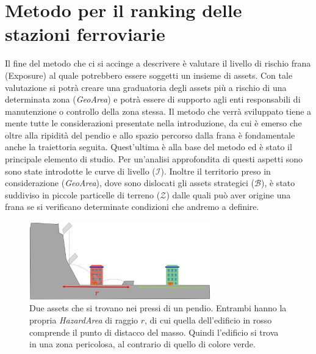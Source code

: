 
\chapter{Metodo per il ranking delle stazioni ferroviarie} %

\label{ch:mathtest} %

Il fine del metodo che ci si accinge a descrivere è valutare il livello di rischio frana (Exposure) al quale potrebbero essere soggetti un insieme di assets. Con tale valutazione si potrà creare una graduatoria degli assets più a rischio di una determinata zona (\textit{GeoArea}) e potrà essere di supporto agli enti responsabili di manutenzione o controllo della zona stessa. Il metodo che verrà sviluppato tiene a mente tutte le considerazioni presentate nella introduzione, da cui è emerso che oltre alla ripidità del pendio e allo spazio percorso dalla frana è fondamentale anche la traiettoria seguita. Quest'ultima è alla base del metodo ed è stato il principale elemento di studio. Per un'analisi approfondita di questi aspetti sono sono state introdotte le curve di livello ($\mathcal{I}$). Inoltre il territorio preso in considerazione (\textit{GeoArea}), dove sono dislocati gli assets strategici ($\mathcal{B}$), è stato suddiviso in piccole particelle di terreno ($\mathcal{Z}$) dalle quali può aver origine una frana se si verificano determinate condizioni che andremo a definire.


\begin{figure}[h]
	\centering
	\includegraphics[width=0.7\textwidth]{images/raggio_di_azione_frana}
	\caption{Due assets che si trovano nei pressi di un pendio. Entrambi hanno la propria \textit{HazardArea} di raggio $r$, di cui quella dell'edificio in rosso comprende il punto di distacco del masso. Quindi l'edificio si trova in una zona pericolosa, al contrario di quello di colore verde. }
	\label{raggio_azione_frana}
\end{figure}

